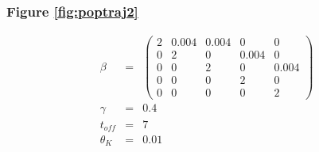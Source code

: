 \documentclass[a4paper,18pt]{report}
\begin{document}
\subsubsection{Figure \ref{fig:poptraj2}}
\begin{eqnarray}
\beta&=& 
\left(
\begin{array}{ccccc}
 2  &	 0.004 & 0.004 & 0  & 0\\
 0 & 2  & 0   & 0.004  & 0\\
 0 &  0  &   2 & 0 & 0.004\\
 0 &  0 & 0  &2 & 0\\
 0 & 0  &  0 & 0 & 2
 \end{array}
\right)\nonumber\\
\gamma&=&0.4\nonumber\\
t_{off} &=& 7\nonumber\\
\theta_K &=& 0.01
\end{eqnarray}
\end{document}
